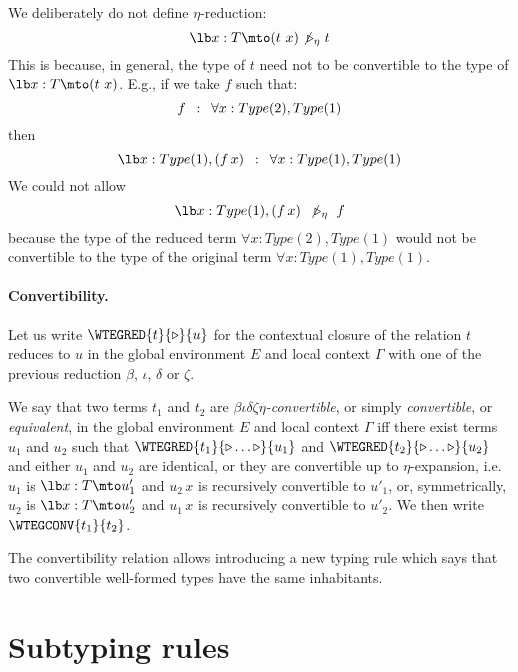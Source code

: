 \Rem We deliberately do not define $\eta$-reduction:
\def\noeta{\hskip-.1em\not\triangleright_\eta}
$$\lb x:T\mto (t\ x)\hskip.1em\noeta\hskip.3em t$$
This is because, in general, the type of $t$ need not to be convertible to the type of $\lb x:T\mto (t\ x)$.
E.g., if we take $f$ such that:
$$f\hskip.5em:\hskip.5em\forall x:Type(2),Type(1)$$
then
$$\lb x:Type(1),(f\, x)\hskip.5em:\hskip.5em\forall x:Type(1),Type(1)$$
We could not allow
$$\lb x:Type(1),(f\,x)\hskip.5em\noeta\hskip.6em f$$
because the type of the reduced term $\forall x:Type(2),Type(1)$
would not be convertible to the type of the original term $\forall x:Type(1),Type(1)$.

\paragraph[Convertibility.]{Convertibility.\label{convertibility}
}

Let us write $\WTEGRED{t}{\triangleright}{u}$ for the contextual closure of the relation $t$ reduces to $u$ in the global environment $E$ and local context $\Gamma$ with one of the previous reduction $\beta$, $\iota$, $\delta$ or $\zeta$.

We say that two terms $t_1$ and $t_2$ are {\em
  $\beta\iota\delta\zeta\eta$-convertible}, or simply {\em
  convertible}, or {\em equivalent}, in the global environment $E$ and
local context $\Gamma$ iff there exist terms $u_1$ and $u_2$ such that
$\WTEGRED{t_1}{\triangleright \ldots \triangleright}{u_1}$ and
$\WTEGRED{t_2}{\triangleright \ldots \triangleright}{u_2}$ and either
$u_1$ and $u_2$ are identical, or they are convertible up to
$\eta$-expansion, i.e. $u_1$ is $\lb x:T\mto u'_1$ and $u_2\,x$ is
recursively convertible to $u'_1$, or, symmetrically, $u_2$ is $\lb
x:T\mto u'_2$ and $u_1\,x$ is recursively convertible to $u'_2$.  We
then write $\WTEGCONV{t_1}{t_2}$.

The convertibility relation allows introducing a new typing rule
which says that two convertible well-formed types have the same
inhabitants.

\section[Subtyping rules]{Subtyping rules
\label{subtyping-rules}}

